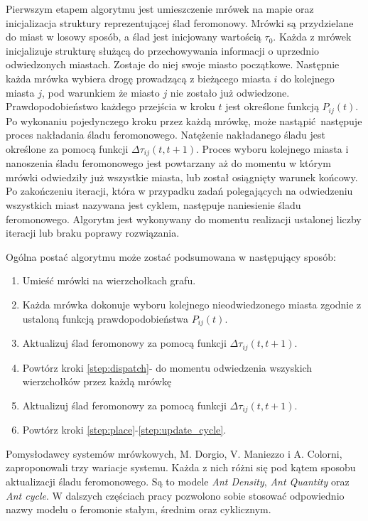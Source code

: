 {    Pierwszym etapem algorytmu jest umieszczenie mrówek na mapie oraz inicjalizacja struktury reprezentującej ślad
    feromonowy. Mrówki są przydzielane do miast w losowy sposób, a ślad jest inicjowany wartością $\tau_0$. Każda z
    mrówek inicjalizuje strukturę służącą do przechowywania informacji o uprzednio odwiedzonych miastach. Zostaje do
    niej swoje miasto początkowe. Następnie każda mrówka wybiera drogę prowadzącą z bieżącego miasta $i$ do kolejnego
    miasta $j$, pod warunkiem że miasto $j$ nie zostało już odwiedzone. Prawdopodobieństwo każdego przejścia w kroku $t$
    jest określone funkcją $P_{ij}(t)$. Po wykonaniu pojedynczego kroku przez każdą mrówkę, może nastąpić następuje
    proces nakładania śladu feromonowego. Natężenie nakładanego śladu jest określone za pomocą funkcji
    $\Delta\tau_{ij}(t, t+1)$. Proces wyboru kolejnego miasta i nanoszenia śladu feromonowego jest powtarzany aż do
    momentu w którym mrówki odwiedziły już wszystkie miasta, lub został osiągnięty warunek końcowy. Po zakończeniu
    iteracji, która w przypadku zadań polegających na odwiedzeniu wszystkich miast nazywana jest cyklem, następuje
    naniesienie śladu feromonowego. Algorytm jest wykonywany do momentu realizacji ustalonej liczby iteracji lub braku
    poprawy rozwiązania\cite{Dorigo1991AntSA}.

    Ogólna postać algorytmu może zostać podsumowana w następujący sposób:

    \begin{enumerate}
        \item \label{step:place} Umieść mrówki na wierzchołkach grafu.
        \item \label{step:dispatch} Każda mrówka dokonuje wyboru kolejnego nieodwiedzonego miasta zgodnie z ustaloną funkcją
        prawdopodobieństwa $P_{ij}(t)$.
        \item \label{step:update} Aktualizuj ślad feromonowy za pomocą funkcji $\Delta\tau_{ij}(t, t+1)$.
        \item Powtórz kroki \ref{step:dispatch}-\label{step:update} do momentu odwiedzenia wszyskich wierzchołków przez
        każdą mrówkę
        \item \label{step:update_cycle} Aktualizuj ślad feromonowy za pomocą funkcji $\Delta\tau_{ij}(t, t+1)$.
        \item Powtórz kroki \ref{step:place}-\ref{step:update_cycle}.
    \end{enumerate}

    Pomysłodawcy systemów mrówkowych, M. Dorgio, V. Maniezzo i A. Colorni, zaproponowali trzy wariacje systemu. Każda z
    nich różni się pod kątem sposobu aktualizacji śladu feromonowego. Są to modele \textit{Ant Density}, \textit{Ant
    Quantity} oraz \textit{Ant cycle}. W dalszych częściach pracy pozwolono sobie stosować odpowiednio nazwy modelu o
    feromonie stałym, średnim oraz cyklicznym.

}

